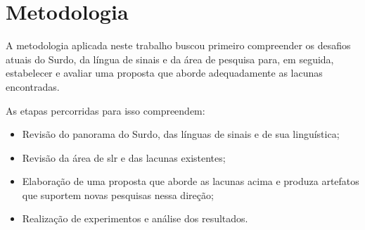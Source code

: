\section{Metodologia}
\label{sec:introducao-metodologia}

A metodologia aplicada neste trabalho buscou primeiro compreender os desafios atuais do Surdo, da língua de sinais e da área de pesquisa para, em seguida, estabelecer e avaliar uma proposta que aborde adequadamente as lacunas encontradas.


As etapas percorridas para isso compreendem:

\begin{itemize}
    \item Revisão do panorama do Surdo, das línguas de sinais e de sua linguística;
    \item Revisão da área de \acrlong{slr} e das lacunas existentes;
    \item Elaboração de uma proposta que aborde as lacunas acima e produza artefatos que suportem novas pesquisas nessa direção;
    \item Realização de experimentos e análise dos resultados.
\end{itemize}



